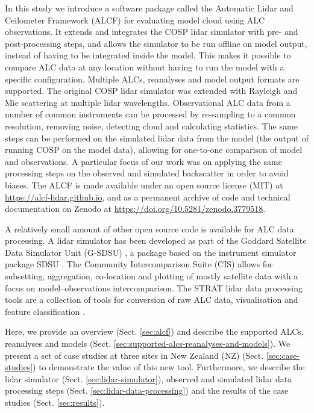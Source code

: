 In this study we introduce a software package called the Automatic Lidar and Ceilometer
Framework (ALCF) for evaluating model cloud using ALC observations. It extends
and integrates the COSP lidar simulator \citep{chiriaco2006,chepfer2007,chepfer2008} with
pre- and post-processing steps, and allows the simulator to be run offline
on model output, instead of having to be integrated inside
the model. This makes it possible to compare ALC data at any location
without having to run the model with a specific configuration.
Multiple ALCs, reanalyses and model output formats are supported.
The original COSP lidar simulator was extended with Rayleigh and Mie scattering
at multiple lidar wavelengths. Observational ALC data from a number of common instruments can
be processed by re-sampling to a common resolution, removing noise, detecting cloud
and calculating statistics. The same steps can be performed on the simulated lidar data
from the model (the output of running COSP on the model data),
allowing for one-to-one comparison of model and observations.
A particular focus of our work was on applying the same processing steps on the
observed and simulated backscatter in order to
avoid biases. The ALCF is made available under an open source license (MIT)
at \url{https://alcf-lidar.github.io}, and as a permanent archive
of code and technical documentation on Zenodo at
\url{https://doi.org/10.5281/zenodo.3779518}.

A relatively small amount of other open source code is available for
ALC data processing. A lidar simulator has been developed as part of the Goddard
Satellite Data Simulator Unit (G-SDSU) \citep{G-SDSU}, a package based on the
instrument simulator package SDSU \citep{masunaga2010}. The Community
Intercomparison Suite (CIS) \citep{watson2016} allows for subsetting,
aggregation, co-location and plotting of mostly satellite
data with a focus on model--observations intercomparison. The STRAT lidar
data processing tools
are a collection of tools for conversion of raw ALC data, visualisation and feature
classification \citep{morille2007}.

Here, we provide an overview (Sect. \ref{sec:alcf}) and describe
the supported ALCs, reanalyses and models (Sect. \ref{sec:supported-alcs-reanalyses-and-models}).
We present a set of case studies at three sites in New Zealand (NZ)
(Sect. \ref{sec:case-studies}) to demonstrate the value of this new tool.
Furthermore, we describe the lidar simulator (Sect. \ref{sec:lidar-simulator}), observed and simulated lidar data processing steps (Sect. \ref{sec:lidar-data-processing}) and the results of the case studies
(Sect. \ref{sec:results}).

